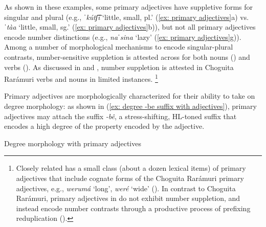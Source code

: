 As shown in these examples, some primary adjectives have suppletive forms for singular and plural (e.g., \textit{ˈkútʃ͡i} `little, small, pl.' (\ref{ex: primary adjectives}a) vs. \textit{ˈtàa} `little, small, sg.' (\ref{ex: primary adjectives}b)), but not all primary adjectives encode number distinctions (e.g., \textit{naˈsina} `lazy' (\ref{ex: primary adjectives}g)). Among a number of morphological mechanisms to encode singular-plural contrasts, number-sensitive suppletion is attested across  for both nouns (\citealt{hill2000marked}) and verbs (\citealt{haugen2015kill}). As discussed in  and , number suppletion is attested in Choguita Rarámuri verbs and nouns in limited instances. \footnote{Closely related  has a small class (about a dozen lexical items) of primary adjectives that include cognate forms of the Choguita Rarámuri primary adjectives, e.g., \textit{werumá} `long', \textit{weré} `wide' (\citealt[238]{miller1996guarijio}). In contrast to Choguita Rarámuri, primary adjectives in  do not exhibit number suppletion, and instead encode number contrasts through a productive process of prefixing reduplication (\citeyear[238]{miller1996guarijio}).}

Primary adjectives are morphologically characterized for their ability to take on degree morphology: as shown in (\ref{ex: degree -be suffix with adjectives}), primary adjectives may attach the suffix \textit{-bê}, a stress-shifting, HL-toned suffix that encodes a high degree of the property encoded by the adjective.


\ea\label{ex: degree -be suffix with adjectives}
{Degree morphology with primary adjectives}

